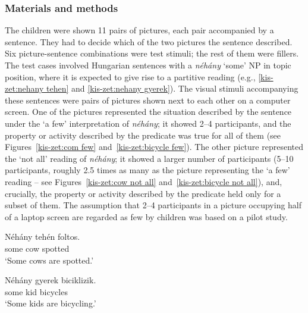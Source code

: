 \documentclass[output=paper]{langscibook}
\begin{document}
\subsubsection{Materials and methods}

The children were shown 11 pairs of pictures, each pair accompanied by a sentence. They had to decide which of the two pictures the sentence described. Six picture-sentence combinations were test stimuli; the rest of them were fillers. The test cases involved Hungarian sentences with a \textit{néhány} `some' NP in topic position, where it is expected to give rise to a partitive reading (e.g., \ref{kis-zet:nehany tehen} and \ref{kis-zet:nehany gyerek}). The visual stimuli accompanying these sentences were pairs of pictures shown next to each other on a computer screen. One of the pictures represented the situation described by the sentence under the `a few' interpretation of \textit{néhány}; it showed 2--4 participants, and the property or activity described by the predicate was true for all of them (see Figures~\ref{kis-zet:com few} and~\ref{kis-zet:bicycle few}). The other picture represented the `not all' reading of \textit{néhány}; it showed a larger number of participants (5--10 participants, roughly 2.5 times as many as the picture representing the `a few' reading – see Figures~\ref{kis-zet:cow not all} and~\ref{kis-zet:bicycle not all}), and, crucially, the property or activity described by the predicate held only for a subset of them. The assumption that 2--4 participants in a picture occupying half of a laptop screen are regarded as few by children was based on a pilot study. 

\begin{multicols}{2}

\ea
\gll \label{kis-zet:nehany tehen}Néhány tehén foltos. \\
some cow spotted \\
\glt `Some cows are spotted.'

\columnbreak

\ex
\gll \label{kis-zet:nehany gyerek}Néhány gyerek biciklizik.\\  
     some kid bicycles\\ 
\glt `Some kids are bicycling.'
\z

\end{multicols}
\end{document}
